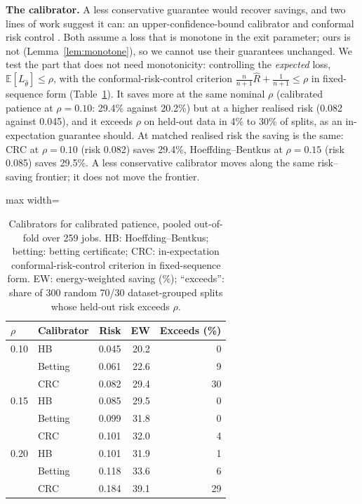 \documentclass[3p,twocolumn,10pt]{elsarticle}
\theoremstyle{definition}
\begin{document}
\textbf{The calibrator.} A less conservative guarantee would recover savings, and two lines of work suggest it can: an upper-confidence-bound calibrator and conformal risk control \citep{jazbec2024fastsafe,angelopoulos2024crc}. Both assume a loss that is monotone in the exit parameter; ours is not (Lemma~\ref{lem:monotone}), so we cannot use their guarantees unchanged. We test the part that does not need monotonicity: controlling the \emph{expected} loss, $\mathbb{E}[L_{\hat\theta}]\le\rho$, with the conformal-risk-control criterion $\frac{n}{n+1}\hat R+\frac1{n+1}\le\rho$ in fixed-sequence form (Table~\ref{tab:crc}). It saves more at the same nominal $\rho$ (calibrated patience at $\rho=0.10$: 29.4\% against 20.2\%) but at a higher realised risk (0.082 against 0.045), and it exceeds $\rho$ on held-out data in 4\% to 30\% of splits, as an in-expectation guarantee should. At matched realised risk the saving is the same: CRC at $\rho=0.10$ (risk 0.082) saves 29.4\%, Hoeffding--Bentkus at $\rho=0.15$ (risk 0.085) saves 29.5\%. A less conservative calibrator moves along the same risk--saving frontier; it does not move the frontier.

\begin{table}[t]
\centering
\caption{Calibrators for calibrated patience, pooled out-of-fold over 259 jobs. HB: Hoeffding--Bentkus; betting: betting certificate; CRC: in-expectation conformal-risk-control criterion in fixed-sequence form. EW: energy-weighted saving (\%); ``exceeds'': share of 300 random 70/30 dataset-grouped splits whose held-out risk exceeds $\rho$.}
\label{tab:crc}
\footnotesize
\begin{adjustbox}{max width=\columnwidth}
\begin{tabular}{llrrr}
\toprule
$\rho$ & Calibrator & Risk & EW & Exceeds (\%) \\
\midrule
0.10 & HB & 0.045 & 20.2 & 0 \\
 & Betting & 0.061 & 22.6 & 9 \\
 & CRC & 0.082 & 29.4 & 30 \\
\midrule
0.15 & HB & 0.085 & 29.5 & 0 \\
 & Betting & 0.099 & 31.8 & 0 \\
 & CRC & 0.101 & 32.0 & 4 \\
\midrule
0.20 & HB & 0.101 & 31.9 & 1 \\
 & Betting & 0.118 & 33.6 & 6 \\
 & CRC & 0.184 & 39.1 & 29 \\
\bottomrule
\end{tabular}
\end{adjustbox}
\end{table}
\end{document}
